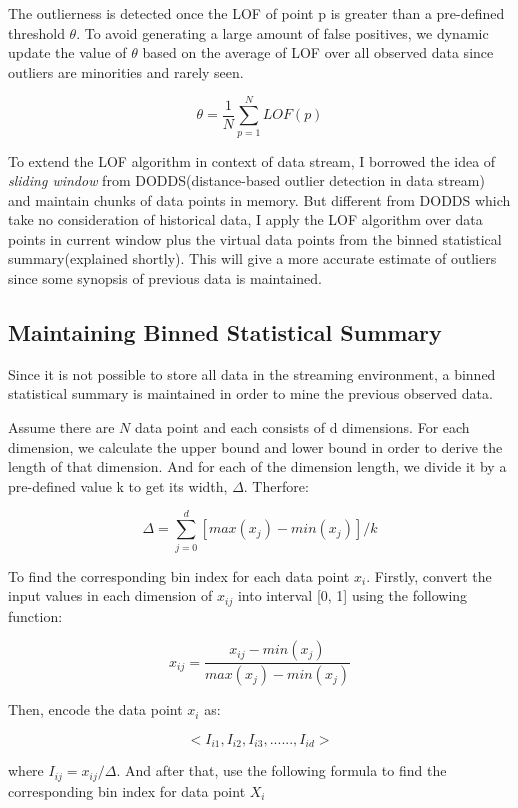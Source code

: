 \documentclass[11pt]{article}       %
\begin{document}
The outlierness is detected once the LOF of point p is greater than a pre-defined threshold $\theta$. To avoid generating a large amount of false positives, we dynamic update the value of $\theta$ based on the average of LOF over all observed data since outliers are minorities and rarely seen.

\[ \theta = \frac{1}{N} \sum_{p=1}^{N} LOF(p) \]

To extend the LOF algorithm in context of data stream, I borrowed the idea of \textit{sliding window} from DODDS(distance-based outlier detection in data stream) and maintain chunks of data points in memory. But different from DODDS which take no consideration of historical data, I apply the LOF algorithm over data points in current window plus the virtual data points from the binned statistical summary(explained shortly). This will give a more accurate estimate of outliers since some synopsis of previous data is maintained.

\subsection{Maintaining Binned Statistical Summary} \label{subsect2}

Since it is not possible to store all data in the streaming environment, a binned statistical summary is maintained in order to mine the previous observed data.

Assume there are $N$ data point and each consists of d dimensions. For each dimension, we calculate the upper bound and lower bound in order to derive the length of that dimension. And for each of the dimension length, we divide it by a pre-defined value k to get its width, $\Delta$.  Therfore:

\[ \Delta = \sum_{j=0}^{d} [max(x_j) - min(x_j)] / k \]

To find the corresponding bin index for each data point $x_i$. Firstly, convert the input values in each dimension of $x_{ij}$ into interval [0, 1] using the following function:

\[ x_{ij} = \frac{x_{ij} - min(x_j)}{max(x_j) - min(x_j)} \]

Then, encode the data point $x_i$ as:

\[ <I_{i1}, I_{i2}, I_{i3}, ......, I_{id}> \]

where $I_{ij} = x_{ij} / \Delta$. And after that, use the following formula to find the corresponding bin index for data point $X_i$
\end{document}
